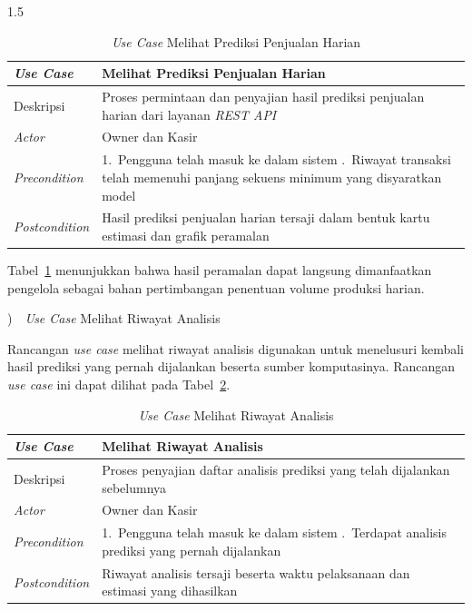 \documentclass[12pt, a4paper, onecolumn, oneside]{report}
\begin{document}
\begin{spacing}{1.5}
\begin{table}[H]
\centering
\caption{\textit{Use Case} Melihat Prediksi Penjualan Harian}
\label{tab:uc-prediksi}
\begin{tabularx}{\textwidth}{|p{3.2cm}|X|}
\hline
\textbf{\textit{Use Case}} & \textbf{Melihat Prediksi Penjualan Harian} \\ \hline
Deskripsi & Proses permintaan dan penyajian hasil prediksi penjualan harian dari layanan \textit{REST API} \\ \hline
\textit{Actor} & Owner dan Kasir \\ \hline
\textit{Precondition} & 1.~Pengguna telah masuk ke dalam sistem \newline 2.~Riwayat transaksi telah memenuhi panjang sekuens minimum yang disyaratkan model \\ \hline
\textit{Postcondition} & Hasil prediksi penjualan harian tersaji dalam bentuk kartu estimasi dan grafik peramalan \\ \hline
\end{tabularx}
\end{table}

Tabel~\ref{tab:uc-prediksi} menunjukkan bahwa hasil peramalan dapat langsung dimanfaatkan pengelola sebagai bahan pertimbangan penentuan volume produksi harian.

)~~\textit{Use Case} Melihat Riwayat Analisis

Rancangan \textit{use case} melihat riwayat analisis digunakan untuk menelusuri kembali hasil prediksi yang pernah dijalankan beserta sumber komputasinya. Rancangan \textit{use case} ini dapat dilihat pada Tabel~\ref{tab:uc-riwayatanalisis}.

\begin{table}[H]
\centering
\caption{\textit{Use Case} Melihat Riwayat Analisis}
\label{tab:uc-riwayatanalisis}
\begin{tabularx}{\textwidth}{|p{3.2cm}|X|}
\hline
\textbf{\textit{Use Case}} & \textbf{Melihat Riwayat Analisis} \\ \hline
Deskripsi & Proses penyajian daftar analisis prediksi yang telah dijalankan sebelumnya \\ \hline
\textit{Actor} & Owner dan Kasir \\ \hline
\textit{Precondition} & 1.~Pengguna telah masuk ke dalam sistem \newline 2.~Terdapat analisis prediksi yang pernah dijalankan \\ \hline
\textit{Postcondition} & Riwayat analisis tersaji beserta waktu pelaksanaan dan estimasi yang dihasilkan \\ \hline
\end{tabularx}
\end{table}


\end{spacing}
\end{document}
